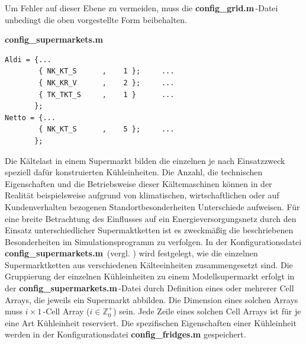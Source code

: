 Um Fehler auf dieser Ebene zu vermeiden, muss die
\textbf{config\_grid.m}$\,$-Datei unbedingt die oben vorgestellte Form
beibehalten.

\vspace{3mm}
\noindent\textbf{config\_supermarkets.m}
\vspace{3mm}


\begin{lstlisting}[float=h!,caption=config\_supermarkets.m,label={csuper}]
%%       Kind of fridge     Anzahl
Aldi = {...
        { NK_KT_S      ,    1 };     ...
        { NK_KR_V      ,    2 };     ...
        { TK_TKT_S     ,    1 }      ...
       };
Netto = {...
        { NK_KT_S      ,    5 };     ...
       };
\end{lstlisting}

Die Kältelast in einem Supermarkt bilden die einzelnen je nach Einsatzzweck
speziell dafür konstruierten Kühleinheiten. Die Anzahl, die technischen
Eigenschaften und die Betriebsweise dieser Kältemaschinen können in der Realität
beispielsweise aufgrund von klimatischen, wirtschaftlichen oder auf
Kundenverhalten bezogenen Standortbesonderheiten Unterschiede
aufweisen. Für eine breite Betrachtung des
Einflusses auf ein Energieversorgungsnetz durch den Einsatz unterschiedlicher
Supermaktketten ist es zweckmäßig die beschriebenen Besonderheiten im
Simulationsprogramm zu verfolgen. In der Konfigurationsdatei
\textbf{config\_supermarkets.m$\,$} (vergl. ) wird festgelegt,
wie die einzelnen Supermarktketten aus verschiedenen Kälteeinheiten
zusammengesetzt sind. Die Gruppierung der einzelnen Kühleinheiten zu einem
Modellsupermarkt erfolgt in der \textbf{config\_supermarkets.m$\,$}-Datei durch
Definition eines oder mehrerer Cell Arrays, die jeweils ein Supermarkt abbilden.
Die Dimension eines solchen Arrays muss $i\times1\,$-Cell Array ($i\in
\mathbb{Z}^+_0$) sein. Jede Zeile eines solchen Cell Arrays ist für je eine
Art Kühleinheit reserviert. Die spezifischen Eigenschaften einer Kühleinheit
werden in der Konfigurationsdatei \textbf{config\_fridges.m} gespeichert.

